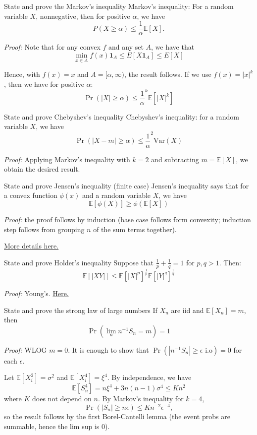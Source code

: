 \documentclass[avery5388,grid,frame]{flashcards}
\newcommand{\E}{\mathbb{E}}
\newcommand{\Var}{\text{Var}}
\begin{document}
\begin{flashcard}
    {State and prove the Markov's inequality}
    Markov's inequality: For a random variable $X$, nonnegative, then for positive $\alpha$, we have
    $$P(X \geq \alpha) \leq \frac 1 \alpha \E[X].$$

    \emph{Proof:} Note that for any convex $f$ and any set $A$, we have that
    $$\min_{x \in A} f(x) \mathbf 1_{A} \leq E[X \mathbf 1_{A}] \leq E[X]$$

    Hence, with $f(x) = x$ and $A = [\alpha,\infty)$, the result follows. If we use $f(x) = |x|^k$, then we have for positive $\alpha$:
    $$\Pr(|X| \geq \alpha) \leq \frac 1 \alpha^k \E[|X|^k]$$
\end{flashcard}


\begin{flashcard}
    {State and prove Chebyshev's inequality}
    Chebyshev's inequality: for a random variable $X$, we have
    $$\Pr(|X - m| \geq \alpha) \leq \frac 1 \alpha^2 \Var(X)$$

    \emph{Proof:} Applying Markov's inequality with $k=2$ and subtracting $m = \E[X]$, we obtain the desired result.
\end{flashcard}


\begin{flashcard}
    {State and prove Jensen's inequality (finite case)}
    Jensen's inequality says that for a convex function $\phi(x)$ and a random variable $X$, we have
    $$\E[\phi(X)] \geq \phi(\E[X])$$

    \emph{Proof:} the proof follows by induction (base case follows form convexity; induction step follows from grouping $n$ of the sum terms together).

    \href{https://en.wikipedia.org/wiki/Jensen%27s_inequality#Proofs}{More details here.}
\end{flashcard}


\begin{flashcard}
    {State and prove Holder's inequality}
    Suppose that $\frac 1 p + \frac 1 q = 1$ for $p,q>1$. Then:
    $$\E[|XY|] \leq \E[|X|^p]^{\frac 1 p} \E[|Y|^q]^{\frac 1 q}$$

    \emph{Proof:} Young's. \href{https://en.wikipedia.org/wiki/H%C3%B6lder%27s_inequality#Proof_of_H%C3%B6lder's_inequality}{Here.}
\end{flashcard}


\begin{flashcard}
    {State and prove the strong law of large numbers}
    If $X_n$ are iid and $\E[X_n] = m$, then
    $$\Pr(\lim_n n^{-1} S_n = m) = 1$$

    \emph{Proof:} WLOG $m=0$. It is enough to show that $\Pr(|n^{-1} S_n| \geq \epsilon \text{ i.o}) = 0$ for each $\epsilon$.

    Let $\E[X_i^2] = \sigma^2$ and $\E[X_i^4] = \xi^4$. By independence, we have
    $$\E[S_n^4] = n \xi^4 + 3n(n-1) \sigma^4 \leq K n^2$$
    where $K$ does not depend on $n$. By Markov's inequality for $k=4$,
    $$\Pr(|S_n| \geq n \epsilon) \leq K n^{-2} \epsilon^{-4},$$
    so the result follows by the first Borel-Cantelli lemma (the event probs are summable, hence the lim sup is $0$).
\end{flashcard}
\end{document}
